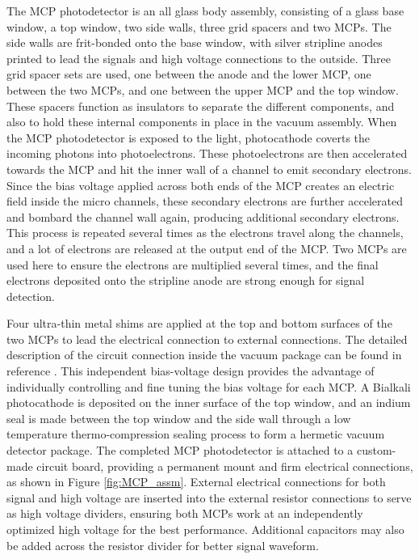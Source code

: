 \documentclass[preprint,5p]{elsarticle}
\begin{document}
The MCP photodetector is an all glass body assembly, consisting of a glass base 
window, a top window, two side walls, three grid spacers and two MCPs. The side 
walls are frit-bonded onto the base window, with silver stripline anodes 
printed to lead the signals and high voltage connections to the outside. Three 
grid spacer sets are used, one between the anode and the lower MCP, one between 
the two MCPs, and one between the upper MCP and the top window. These spacers 
function as insulators to separate the different components, and also to hold 
these internal components in place in the vacuum assembly. When the MCP 
photodetector is exposed to the light, photocathode coverts the incoming 
photons into photoelectrons. These photoelectrons are then accelerated towards 
the MCP and hit the inner wall of a channel to emit secondary electrons. Since 
the bias voltage applied across both ends of the MCP creates an electric field 
inside the micro channels, these secondary electrons are further accelerated 
and bombard the channel wall again, producing additional secondary electrons.  
This process is repeated several times as the electrons travel along the 
channels, and a lot of electrons are released at the output end of the MCP. Two 
MCPs are used here to ensure the electrons are multiplied several times, and 
the final electrons deposited onto the stripline anode are strong enough for 
signal detection.  

Four ultra-thin metal shims are applied at the top and bottom surfaces of the 
two MCPs to lead the electrical connection to external connections. The 
detailed description of the circuit connection inside the vacuum package can be 
found in reference \cite{Xia-MCPs}. This independent bias-voltage design 
provides the advantage of individually controlling and fine tuning the bias 
voltage for each MCP. A Bialkali photocathode is deposited on the inner surface 
of the top window, and an indium seal is made between the top window and the 
side wall through a low temperature thermo-compression sealing process to form 
a hermetic vacuum detector package. The completed MCP photodetector is attached 
to a custom-made circuit board, providing a permanent mount and firm electrical 
connections, as shown in Figure \ref{fig:MCP_assm}. External electrical 
connections for both signal and high voltage are inserted into the external 
resistor connections to serve as high voltage dividers, ensuring both MCPs work 
at an independently optimized high voltage for the best performance.  
Additional capacitors may also be added across the resistor divider for better 
signal waveform.  
\end{document}
